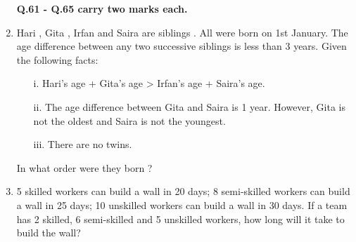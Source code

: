 \documentclass[12pt]{article}
\theoremstyle{remark}
\begin{document}
\begin{enumerate}
\textbf{Q.61 - Q.65 carry two marks each.}

\item Hari , Gita , Irfan  and Saira  are siblings . All were born on 1st January. The age difference between any two successive siblings  is less than 3 years. Given the following facts:
\begin{enumerate}
    \item[i.] Hari's age + Gita's age > Irfan's age + Saira's age.
    \item[ii.] The age difference between Gita and Saira is 1 year. However, Gita is not the oldest and Saira is not the youngest.
    \item[iii.] There are no twins.
\end{enumerate}
In what order were they born ?
\begin{enumerate}
\end{enumerate}
\hfill{}

\item 5 skilled workers can build a wall in 20 days; 8 semi-skilled workers can build a wall in 25 days; 10 unskilled workers can build a wall in 30 days. If a team has 2 skilled, 6 semi-skilled and 5 unskilled workers, how long will it take to build the wall?
\begin{enumerate}
\end{enumerate}
\hfill{}


\end{enumerate}
\end{document}
